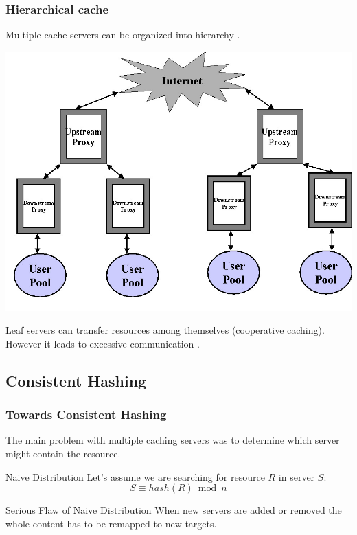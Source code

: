 \documentclass{beamer}
\begin{document}
\begin{frame}
\frametitle{Hierarchical cache}
\begin{block}{}
Multiple cache servers can be organized into hierarchy \cite{chankhunthod1995hierarchical}.
\end{block}
\begin{center}
\includegraphics[width=0.54\linewidth]{fig5.jpg}
\pause
\begin{block}{}
Leaf servers can transfer resources among themselves (cooperative caching). 
However it leads to excessive communication \cite{povey1997distributed} \cite{wolman1999scale}.
\end{block}
\end{center}

\end{frame}

\subsection{Consistent Hashing}

\begin{frame}
\frametitle{Towards Consistent Hashing \cite{karger1997consistent}}
\begin{block}{}
The main problem with multiple caching servers was to determine which server
might contain the resource. 
\end{block}

\pause
\begin{block}{Naive Distribution}
Let's assume we are searching for resource $R$ in server $S$: 
\begin{equation*}
S \equiv hash(R) \bmod n
\end{equation*}
\end{block}

\pause
\begin{block}{Serious Flaw of Naive Distribution}
When new servers are added or removed the whole content has to be remapped to new targets.
\end{block}

\end{frame}
\end{document}
